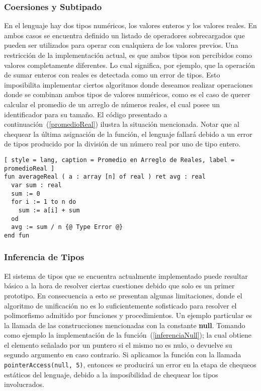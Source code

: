 \subsubsection{Coersiones y Subtipado}

En el lenguaje hay dos tipos numéricos, los valores enteros y los valores reales.
En ambos casos se encuentra definido un listado de operadores sobrecargados que pueden ser utilizados para operar con cualquiera de los valores previos.
Una restricción de la implementación actual, es que ambos tipos son percibidos como valores completamente diferentes.
Lo cual significa, por ejemplo, que la operación de sumar enteros con reales es detectada como un error de tipos.
Esto imposibilita implementar ciertos algoritmos donde deseamos realizar operaciones donde se combinan ambos tipos de valores numéricos, como es el caso de querer calcular el promedio de un arreglo de números reales, el cual posee un identificador para su tamaño.
El código presentado a continuación~(\ref{promedioReal}) ilustra la situación mencionada.
Notar que al chequear la última asignación de la función, el lenguaje fallará debido a un error de tipos producido por la división de un número real por uno de tipo entero.

\begin{lstlisting}[ style = lang, caption = Promedio en Arreglo de Reales, label = promedioReal ]
fun averageReal ( a : array [n] of real ) ret avg : real
  var sum : real
  sum := 0
  for i := 1 to n do
    sum := a[i] + sum
  od
  avg := sum / n {@ Type Error @}
end fun
\end{lstlisting}

\subsubsection{Inferencia de Tipos}

El sistema de tipos que se encuentra actualmente implementado puede resultar básico a la hora de resolver ciertas cuestiones debido que solo es un primer prototipo.
En consecuencia a esto se presentan algunas limitaciones, donde el algoritmo de unificación no es lo suficientemente sofisticado para resolver el polimorfismo admitido por funciones y procedimientos.
Un ejemplo particular es la llamada de las construcciones mencionadas con la constante \textbf{null}.
Tomando como ejemplo la implementación de la función~(\ref{inferenciaNull}); la cual obtiene el elemento señalado por un puntero si el mismo no es nulo, o devuelve su segundo argumento en caso contrario.
Si aplicamos la función con la llamada \lstinline[style = lang]{pointerAccess(null, 5)}, entonces se producirá un error en la etapa de chequeos estáticos del lenguaje, debido a la imposibilidad de chequear los tipos involucrados.

